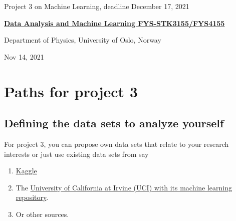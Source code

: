\documentclass[%
oneside,                 %
final,                   %
10pt]{article}
\begin{document}

\newcommand{\exercisesection}[1]{\subsection*{#1}}






\thispagestyle{empty}

\begin{center}
{\LARGE\bf
\begin{spacing}{1.25}
Project 3 on Machine Learning, deadline December 17, 2021
\end{spacing}
}
\end{center}


\begin{center}
{\bf \href{{http://www.uio.no/studier/emner/matnat/fys/FYS3155/index-eng.html}}{Data Analysis and Machine Learning FYS-STK3155/FYS4155}}
\end{center}

    \begin{center}
\centerline{{\small Department of Physics, University of Oslo, Norway}}
\end{center}
    

\begin{center}
Nov 14, 2021
\end{center}

\vspace{1cm}


\section*{Paths for project 3}

\subsection*{Defining the data sets to analyze yourself}

For project 3, you can propose own data sets that relate to your research interests or just use existing data sets from say
\begin{enumerate}
\item \href{{https://www.kaggle.com/datasets}}{Kaggle} 

\item The \href{{https://archive.ics.uci.edu/ml/index.php}}{University of California at Irvine (UCI) with its  machine learning repository}.

\item Or other sources.
\end{enumerate}
\end{document}

